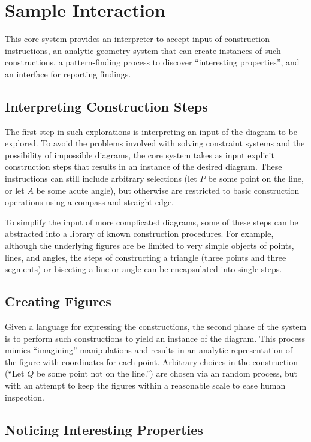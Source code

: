 \section{Sample Interaction}

This core system provides an interpreter to accept input of
construction instructions, an analytic geometry system that can create
instances of such constructions, a pattern-finding process to discover
``interesting properties'', and an interface for reporting findings.

\subsection{Interpreting Construction Steps}

The first step in such explorations is interpreting an input of the
diagram to be explored.  To avoid the problems involved with solving
constraint systems and the possibility of impossible diagrams, the
core system takes as input explicit construction steps that results in
an instance of the desired diagram.  These instructions can still
include arbitrary selections (let $P$ be some point on the line, or
let $A$ be some acute angle), but otherwise are restricted to basic
construction operations using a compass and straight edge.

To simplify the input of more complicated diagrams, some of these
steps can be abstracted into a library of known construction
procedures.  For example, although the underlying figures are be
limited to very simple objects of points, lines, and angles, the steps
of constructing a triangle (three points and three segments) or
bisecting a line or angle can be encapsulated into single steps.

\subsection{Creating Figures}

Given a language for expressing the constructions, the second phase of
the system is to perform such constructions to yield an instance of
the diagram.  This process mimics ``imagining'' manipulations and
results in an analytic representation of the figure with coordinates
for each point.  Arbitrary choices in the construction (``Let $Q$ be
some point not on the line.'') are chosen via an random process, but
with an attempt to keep the figures within a reasonable scale to ease
human inspection.

\subsection{Noticing Interesting Properties}
\label{sec:interest}


